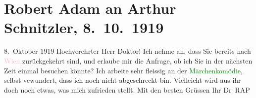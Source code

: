 

               \section[Robert Adam an Arthur Schnitzler, 8. 10. 1919]{ Robert Adam an Arthur Schnitzler, 8. 10. 1919}\nopagebreak{}\rehead{ }\normalsize\beginnumbering{} \toendnotes[C]{\smallbreak\pagebreak[2]} 
\pstart
           \raggedleft{}{\pb}8. Oktober 1919\pend
           \pstart{}Hochverehrter Herr Doktor!\pend\pstart
           Ich nehme an, dass Sie bereits nach \textcolor{pink}{Wien}{}\ledrightnote{\textcolor{pink}{Wien}}
                    zurückgekehrt sind, und erlaube mir die Anfrage, ob ich Sie in der nächsten Zeit
                    einmal besuchen könnte?\pend
           \pstart
           Ich arbeite sehr fleissig an der \textcolor{green}{Märchenkomödie}{}\ledrightnote{\textcolor{green}{Märchenkomödie}}, selbst vewundert, dass ich noch nicht abgeschreckt bin.
                    Vielleicht wird aus ihr doch noch etwas, was mich zufrieden stellt. Mit den
                    besten Grüssen Ihr \spacefill\mbox{Dr RAP}\pend
           \endnumbering{}  
      